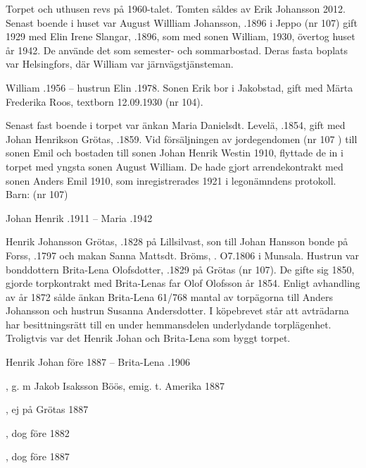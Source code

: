 
Torpet och uthusen revs på 1960-talet. Tomten såldes av Erik Johansson 2012. Senast boende i huset var August Willliam Johansson, .1896 i Jeppo (nr 107) gift 1929 med Elin Irene Slangar, .1896, som med sonen William,  1930, övertog huset år 1942. De använde det som semester- och sommarbostad. Deras fasta boplats var Helsingfors, där William var järnvägstjänsteman.

William .1956  --  hustrun Elin .1978.
Sonen Erik bor i Jakobstad, gift med Märta Frederika Roos, textborn 12.09.1930 (nr 104).


Senast fast boende i torpet var änkan Maria Danielsdt. Levelä, .1854, gift med Johan Henrikson Grötas, .1859. Vid försäljningen av jordegendomen (nr 107 ) till sonen Emil och bostaden till sonen Johan Henrik Westin 1910, flyttade de in i torpet med yngsta sonen August William. De hade gjort arrendekontrakt med sonen Anders Emil 1910, som inregistrerades 1921 i legonämndens protokoll.  Barn: (nr 107)

Johan Henrik .1911  --  Maria .1942


Henrik Johansson Grötas, .1828 på Lillsilvast, son till Johan Hansson bonde på Forss, .1797 och makan Sanna Mattsdt. Bröms, . O7.1806 i Munsala. Hustrun var bonddottern Brita-Lena Olofsdotter, .1829 på Grötas (nr 107). De gifte sig 1850, gjorde torpkontrakt med Brita-Lenas far Olof Olofsson år 1854. Enligt avhandling av år 1872 sålde änkan Brita-Lena 61/768 mantal av torpägorna till Anders Johansson och hustrun Susanna Andersdotter. I köpebrevet står att avträdarna har besittningsrätt till en under hemmansdelen underlydande torplägenhet. Troligtvis var det Henrik Johan och Brita-Lena som byggt torpet.

Henrik Johan \textdied före 1887  --  Brita-Lena .1906
\begin{jhchildren}
  \item {}
  \item {}, g. m Jakob Isaksson Böös, emig. t. Amerika 1887
  \item {}
  \item {}
  \item {}
  \item {}, ej på Grötas 1887
  \item {}, dog före 1882
  \item {}, dog före 1887
\end{jhchildren}



